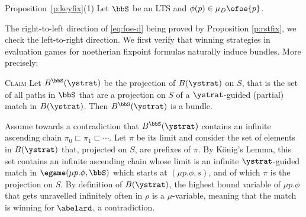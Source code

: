 
\begin{proofof}{Proposition~\ref{p:keyfix}(1)}
%    
Let $\bbS$ be an LTS and $\phi(p) \in \mu_{D}\ofoe{p}$. 

The right-to-left direction of \eqref{eq:foe-d} being proved by 
Proposition \ref{p:rstfix}, we check the left-to-right direction.
We first verify that winning strategies in evaluation games for noetherian 
fixpoint formulas naturally induce bundles. 
More precisely:
\medskip

\textsc{Claim}
Let $B^\bbS(\ystrat)$ be the projection of $B(\ystrat)$ on $S$, that is the set
of all paths in $\bbS$ that are a projection on $S$ of a $\ystrat$-guided 
(partial) match in $B(\ystrat)$. Then $B^\bbS(\ystrat)$ is a bundle.
\medskip

\begin{pfclaim}
Assume towards a contradiction that $B^\bbS(\ystrat)$ contains an infinite 
ascending chain $\pi_{0} \sqsubset \pi_{1} \sqsubset \cdots$. 
Let $\pi$ be its limit and consider the set of elements in $B(\ystrat)$ that,
projected on $S$, are prefixes of $\pi$. 
By  K\"{o}nig's Lemma, this set contains an infinite ascending chain whose 
limit is an infinite $\ystrat$-guided match in $\egame(\mu p. \phi,\bbS)$
which starts at $(\mu p. \phi,s)$, and of which $\pi$ is the projection on $S$.
By definition of $B(\ystrat)$,  the highest bound variable of $\mu p. \phi$ 
that gets unravelled infinitely often in $\rho$ is a $\mu$-variable, meaning 
that the match is winning for $\abelard$, a contradiction.
\end{pfclaim}


\end{proofof}
